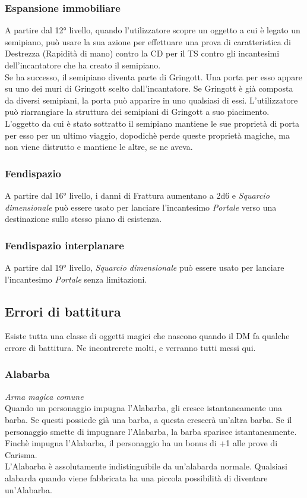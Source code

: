 \subsubsection{Espansione immobiliare}
A partire dal 12° livello, quando l'utilizzatore scopre un oggetto a cui è legato un semipiano, può usare la sua azione per effettuare una prova di caratteristica di Destrezza (Rapidità di mano) contro la CD per il TS contro gli incantesimi dell'incantatore che ha creato il semipiano.\\
Se ha successo, il semipiano diventa parte di Gringott. Una porta per esso appare su uno dei muri di Gringott scelto dall'incantatore. Se Gringott è già composta da diversi semipiani, la porta può apparire in uno qualsiasi di essi. L'utilizzatore può riarrangiare la struttura dei semipiani di Gringott a suo piacimento.\\
L'oggetto da cui è stato sottratto il semipiano mantiene le sue proprietà di porta per esso per un ultimo viaggio, dopodichè perde queste proprietà magiche, ma non viene distrutto e mantiene le altre, se ne aveva.

\subsubsection{Fendispazio}
A partire dal 16° livello, i danni di Frattura aumentano a 2d6 e \textit{Squarcio dimensionale} può essere usato per lanciare l'incantesimo \textit{Portale} verso una destinazione sullo stesso piano di esistenza.

\subsubsection{Fendispazio interplanare}
A partire dal 19° livello, \textit{Squarcio dimensionale} può essere usato per lanciare l'incantesimo \textit{Portale} senza limitazioni.

\subsection{Errori di battitura}
Esiste tutta una classe di oggetti magici che nascono quando il DM fa qualche errore di battitura. Ne incontrerete molti, e verranno tutti messi qui.

\subsubsection{Alabarba}
\textit{Arma magica comune}\\
Quando un personaggio impugna l'Alabarba, gli cresce istantaneamente una barba. Se questi possiede già una barba, a questa crescerà un'altra barba. Se il personaggio smette di impugnare l'Alabarba, la barba sparisce istantaneamente. Finchè impugna l'Alabarba, il personaggio ha un bonus di +1 alle prove di Carisma.\\
L'Alabarba è assolutamente indistinguibile da un'alabarda normale. Qualsiasi alabarda quando viene fabbricata ha una piccola possibilità di diventare un'Alabarba.